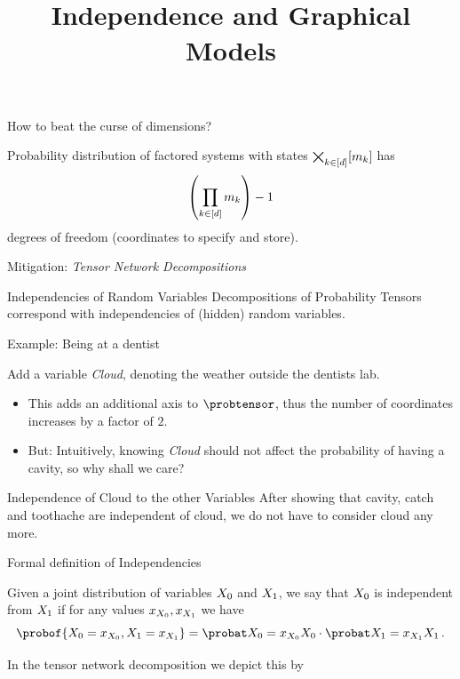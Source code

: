 \documentclass{beamer}
\title[Independence and Graphical Models]{
    \coursechaptertwo \\
    {\huge Independence and Graphical Models}
}
\begin{document}
    {\frame[plain]{\titlepage}}



\begin{frame}{How to beat the curse of dimensions?}

    Probability distribution of factored systems with states $\bigtimes_{k\in[d]}[m_{k}]$ has
    \[\left(\prod_{k\in[d]}m_{k}\right) -1 \]
    degrees of freedom (coordinates to specify and store).

    \medskip

    Mitigation: \emph{Tensor Network Decompositions}

    \begin{block}{Independencies of Random Variables}
        Decompositions of Probability Tensors correspond with independencies of (hidden) random variables.
    \end{block}

\end{frame}



\begin{frame}{Example: Being at a dentist}

    Add a variable \emph{Cloud}, denoting the weather outside the dentists lab.
    \begin{itemize}
        \item This adds an additional axis to $\probtensor$, thus the number of coordinates increases by a factor of $2$.
        \item But: Intuitively, knowing \emph{Cloud} should not affect the probability of having a cavity, so why shall we care?
    \end{itemize}

    \begin{block}{Independence of Cloud to the other Variables}
        After showing that cavity, catch and toothache are independent of cloud, we do not have to consider cloud any more.
    \end{block}

\end{frame}



\begin{frame}{Formal definition of Independencies}

    \begin{definition}[Independence]
	Given a joint distribution of variables $X_{0}$ and $X_{1}$, we say that $X_{0}$ is independent from $X_{1}$ if for any values $x_{X_{0}},x_{X_{1}}$ we have
    \[ \probof{\exrandom=\catindexof{\exrandom},\secexrandom=\catindexof{\secexrandom}}
    = \margprobof{\exrandom=\catindexof{\exrandom}}{\exrandom}
    \cdot
    \margprobof{\secexrandom=\catindexof{\secexrandom}}{\secexrandom} \, . \]
    \end{definition}
    In the tensor network decomposition we depict this by
    \begin{center}
        
    \end{center}
\end{frame}
\end{document}
